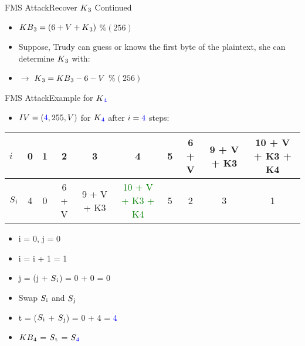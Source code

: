 \documentclass[
	aspectratio=169,	%
	onlytextwidth,		%
	t					%
	]{beamer}
\begin{document}
\begin{frame}[fragile]{FMS Attack}{Recover $K\textsubscript{3}$ Continued}

	\begin{itemize}
		\item $KB\textsubscript{3} = (6 + V + K\textsubscript{3})$ $\% (256)$
		\item Suppose, Trudy can guess or knows the first byte of the plaintext, she can determine $K\textsubscript{3}$ with:
		\item $\rightarrow$ $K\textsubscript{3}  = KB\textsubscript{3} - 6 - V$ $\% (256)$
	\end{itemize}
\end{frame}


\begin{frame}[fragile]{FMS Attack}{Example for $K\textsubscript{\textcolor{blue}{4}}$ }
	\begin{itemize}
		\item $IV = (\textcolor{blue}{4},255,V)$ for $K\textsubscript{\textcolor{blue}{4}}$ after $i=\textcolor{blue}{4}$ steps:
	\end{itemize}

	\small
	
	\begin{table}[h!]
		\begin{center}
			\begin{tabular}{l|c|c|c|c|c|c|c|c|c}
			$i$ & 0 & 1 & 2 & 3 & 4 & 5 & 6 + V & 9 + V + K3 & 10 + V + K3 + K4\\
			\hline
			$S\textsubscript{i}$ & 4 & 0 & 6 + V & 9 + V + K3 & \textcolor{green}{10 + V + K3 + K4} & 5 & 2 & 3 & 1\\
			\end{tabular}
		\end{center}
	\end{table}

	\begin{itemize}
		\item i = 0, j = 0
		\item i = i + 1 = 1
		\item j = (j + $S\textsubscript{i}$) = 0 + 0 = 0
		\item Swap $S\textsubscript{i}$ and $S\textsubscript{j}$
		\item t = ($S\textsubscript{i}$ + $S\textsubscript{j}$) = 0 + 4 = \textcolor{blue}{4}
		\item $KB\textsubscript{4}$ = $S\textsubscript{t}$ = $S\textsubscript{\textcolor{blue}{4}}$
	\end{itemize}

	\normalsize

\end{frame}
\end{document}
